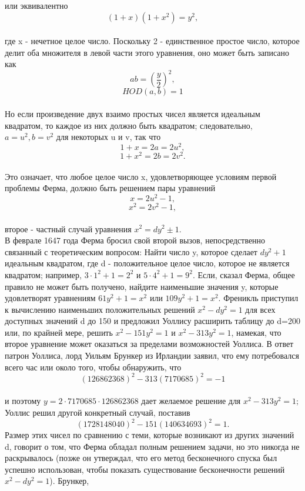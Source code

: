 \documentclass[11pt]{article}
\begin{document}
или эквивалентно $$(1+x)(1+x^{2})=y^{2},$$ \\
где x - нечетное целое число. Поскольку 2 - единственное простое число, которое делит оба множителя в левой части этого уравнения, оно может быть записано как $$ ab=(\frac{y}{2})^{2}, $$ $$ HOD(a,b)=1$$ \\ 
Но если произведение двух взаимо простых чисел является идеальным квадратом, то каждое из них должно быть квадратом; следовательно, $a=u^{2}, b=v^{2}$ для некоторых u и v, так что $$1+x=2a=2u^{2},$$ $$ 1+x^{2}=2b=2v^{2}.$$ \\
Это означает, что любое целое число x, удовлетворяющее условиям первой проблемы Ферма, должно быть решением пары уравнений $$x=2u^{2}-1,$$ $$ x^{2}=2v^{2}-1,$$ \\
второе - частный случай уравнения $x^{2}=dy^{2}\pm1.$ \\
В феврале 1647 года Ферма бросил свой второй вызов, непосредственно связанный с теоретическим вопросом: Найти число y, которое сделает $dy^{2}+1$ идеальным квадратом, где d - положительное целое число, которое не является квадратом; например, $3\cdot1^{2}+1=2^{2}$ и $5\cdot4^{2}+1=9^{2}.$ Если, сказал Ферма, общее правило не может быть получено, найдите наименьшие значения y, которые удовлетворят уравнениям $61y^{2}+1=x^{2}$ или $109y^{2}+1=x^{2}.$ Френикль приступил к вычислению наименьших положительных решений $x^{2}-dy^{2}=1$ для всех доступных значений d до 150 и предложил Уоллису расширить таблицу до d=200 или, по крайней мере, решить $x^{2}-151y^{2}=1$ и $x^{2}-313y^{2}=1$, намекая, что второе уравнение может оказаться за пределами возможностей Уоллиса. В ответ патрон Уоллиса, лорд Уильям Брункер из Ирландии заявил, что ему потребовался всего час или около того, чтобы обнаружить, что $$(126862368)^{2}-313(7170685)^{2}=-1$$ \\
и поэтому $y=2\cdot7170685\cdot126862368$ дает желаемое решение для $x^{2}-313y^{2}=1;$ Уоллис решил другой конкретный случай, поставив $$(1728148040)^{2}-151(140634693)^{2}=1.$$ Размер этих чисел по сравнению с теми, которые возникают из других значений d, говорит о том, что Ферма обладал полным решением задачи, но это никогда не раскрывалось (позже он утверждал, что его метод бесконечного спуска был успешно использован, чтобы показать существование бесконечности решений $x^{2}-dy^{2}=1$). Брункер,
\end{document}
